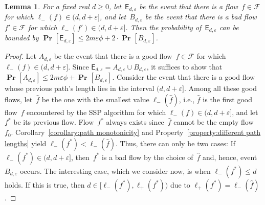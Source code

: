 \documentclass[11pt]{article}
\newtheorem{lemma}[theorem]{Lemma}
\newcommand{\F}{\mathcal{F}}
\newcommand{\e}{\varepsilon}
\renewcommand{\sp}{\ell}
\newcommand{\event}{\mathsf{E}}
\renewcommand{\Pr}[2][]{\operatorname{\textbf{Pr}}_{#1}\left[#2\right]}
\newcommand{\spm}[1][]{\sp^{#1}_{-}}
\newcommand{\spp}[1][]{\sp^{#1}_{+}}
\begin{document}
\begin{lemma}
\label{lemma:loser gap}
For a fixed real $d \geq 0$, let~$\event_{d, \e}$ be the event that there is a flow~$f \in \F$ for which $\spm(f) \in (d, d+\e]$, and let~$B_{d, \e}$ be the event that there is a bad flow~$f' \in \F$ for which $\spm(f') \in (d, d+\e]$. Then the probability of~$\event_{d, \e}$ can be bounded by
$
  \Pr{\event_{d, \e}} \leq 2m \e \phi + 2 \cdot \Pr{B_{d, \e}}
$.
\end{lemma}

\begin{proof}
Let $A_{d, \e}$ be the event that there is a good flow~$f \in \F$ for which $\spm(f) \in (d, d+\e]$. Since $\event_{d, \e} = A_{d, \e} \cup B_{d, \e}$, it suffices to show that $\Pr{A_{d, \e}} \leq 2m \e \phi + \Pr{B_{d, \e}}$. Consider the event that there is a good flow whose previous path's length lies in the interval $(d, d+\e]$. Among all these good flows, let~$\hat{f}$ be the one with the smallest value $\spm(\hat{f})$, i.e., $\hat{f}$ is the first good flow~$f$ encountered by the SSP algorithm for which $\spm(f) \in (d, d+\e]$, and let~$f^*$ be its previous flow. Flow~$f^*$ always exists since~$\hat{f}$ cannot be the empty flow~$f_0$. Corollary~\ref{corollary:path monotonicity} and Property~\ref{property:different path lengths} yield $\spm(f^*) < \spm(\hat{f})$. Thus, there can only be two cases: If $\spm(f^*) \in (d, d+\e]$, then~$f^*$ is a bad flow by the choice of~$\hat{f}$ and, hence, event~$B_{d, \e}$ occurs. The interesting case, which we consider now, is when $\spm(f^*) \leq d$ holds. If this is true, then $d \in [\spm(f^*), \spp(f^*))$ due to $\spp(f^*) = \spm(\hat{f})$.


\end{proof}
\end{document}
